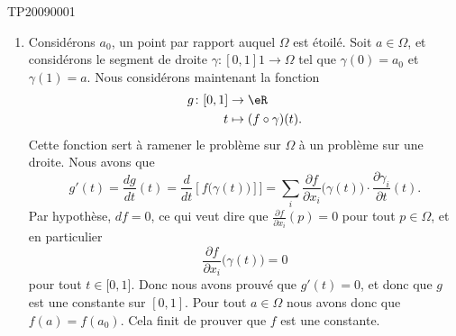 \begin{corrige}{TP20090001}
\begin{enumerate}
		\item
			Considérons $a_0$, un point par rapport auquel $\Omega$ est étoilé. Soit $a\in\Omega$, et considérons le segment de droite $\gamma\colon [0,1]1\to \Omega$ tel que $\gamma(0)=a_0$ et $\gamma(1)=a$. Nous considérons maintenant la fonction
			\begin{equation}
				\begin{aligned}
					g\colon [0,1]&\to \eR \\
					t&\mapsto (f\circ \gamma)(t). 
				\end{aligned}
			\end{equation}
			Cette fonction sert à ramener le problème sur $\Omega$ à un problème sur une droite. Nous avons que 
			\begin{equation}
				g'(t)=\frac{ dg }{ dt }(t)=\frac{ d }{ dt }\left[ f\big( \gamma(t) \big) \right]]=\sum_i\frac{ \partial f }{ \partial x_i }\big( \gamma(t) \big)\cdot\frac{ \partial \gamma_i }{ \partial t }(t).
			\end{equation}
			Par hypothèse, $df=0$, ce qui veut dire que $\frac{ \partial f }{ \partial x_i }(p)=0$ pour tout $p\in\Omega$, et en particulier
			\begin{equation}
				\frac{ \partial f }{ \partial x_i }\big( \gamma(t) \big)=0
			\end{equation}
			pour tout $t\in\mathopen[ 0 , 1 \mathclose]$. Donc nous avons prouvé que $g'(t)=0$, et donc que $g$ est une constante sur $[0,1]$. Pour tout $a\in\Omega$ nous avons donc que $f(a)=f(a_0)$. Cela finit de prouver que $f$ est une constante.

	\end{enumerate}

\end{corrige}
